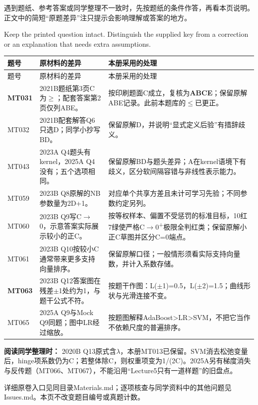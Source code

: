 


遇到题纸、参考答案或同学整理不一致时，先按题纸的条件作答，再看本页说明。正文中的简短“原题差异”注只提示会影响理解或答案的地方。


Keep the printed question intact. Distinguish the supplied key from a correction or an explanation that needs extra assumptions.


\begingroup
\small\setlength{\tabcolsep}{3pt}
\renewcommand{\arraystretch}{1.22}
\begin{longtable}{@{}>{\raggedright\arraybackslash}p{}>{\raggedright\arraybackslash}p{}>{\raggedright\arraybackslash}p{}@{}}
\toprule
题号 & 原材料的差异 & 本册采用的处理 \\
\midrule\endfirsthead
题号 & 原材料的差异 & 本册采用的处理 \\
\midrule\endhead
\bottomrule\endfoot
\textbf{MT031} & 2021B题纸第3页C为\ensuremath{\ge}；配套答案第2页仅列ABE。 & 按印刷题面C成立，复核为\textbf{ABCE}；保留原解ABE记录。此前本题库的\ensuremath{\le}已更正。 \\
MT032 & 2021B配套解答Q6只选D；同学小抄写BD。 & 保留原解D，并说明“显式定义后验”有措辞歧义。 \\
MT043 & 2023A Q4题头有kernel，2025A Q4没有；五个选项相同。 & 保留原解BD与题头差异；A在kernel语境下有歧义，区分软间隔容错与非线性表示能力。 \\
MT059 & 2023B Q8原解的NB参数量为2D+1。 & 对应单个共享方差且未计可学习先验；不同参数约定另列。 \\
MT060 & 2023B Q9写C\ensuremath{\to}0，示意答案实际展示较小的正C。 & 按等权样本、偏置不受惩罚的标准目标，10红7绿使严格C\ensuremath{\to}0\textsuperscript{+}极限全判红类；保留原解小正C草图并区分C=0端点。 \\
MT061 & 2023B Q10按较小C通常带来更多支持向量排序。 & 保留原解口径；一般情形须看实际支持向量数，并计入系数存储。 \\
\textbf{MT063} & 2023B Q12答案图在残差\ensuremath{\pm}1处约为1，与题干公式不符。 & 按题干作图：L(\ensuremath{\pm}1)=0.5，L(\ensuremath{\pm}2)=1.5；曲线形状与光滑连接不变。 \\
MT065 & 2025A Q9与Mock Q9同题；图中LR经过缩放。 & 按题图解释AdaBoost>LR>SVM，不把它当作不依赖尺度的普遍排序。 \\
\bottomrule
\end{longtable}
\endgroup


\textbf{阅读同学整理时：} 2020B Q13原式含\ensuremath{\lambda}，本册MT013已保留。SVM消去松弛变量后，hinge项系数仍为C；若整体除C，则权重项变为1/(2C)。2025A另有梯度消失与反传题（MT066、MT067），不能沿用“Lecture5只有一道样题”的旧盘点。


详细原卷入口见同目录Materials.md；逐项核查与同学资料中的其他问题见Issues.md。本页不改变题目编号或真题计数。
